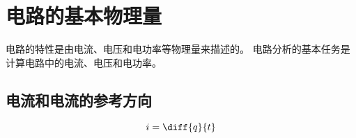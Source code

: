 \section{电路的基本物理量}

电路的特性是由电流、电压和电功率等物理量来描述的。
电路分析的基本任务是计算电路中的电流、电压和电功率。

\subsection{电流和电流的参考方向}

\begin{equation}
i = \diff{q}{t}
\end{equation}
